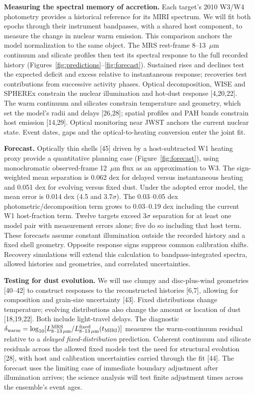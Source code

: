 \documentclass[12pt]{article}
\begin{document}
\clearpage
\noindent\textbf{Measuring the spectral memory of accretion.}
Each target's 2010 W3/W4 photometry provides a historical reference for its MIRI spectrum. We will fit both epochs through their instrument bandpasses, with a shared host component, to measure the change in nuclear warm emission. This comparison anchors the model normalization to the same object. The MRS rest-frame 8--13~$\mu$m continuum and silicate profiles then test its spectral response to the full recorded history (Figures~\ref{fig:predictions}--\ref{fig:forecast}). Sustained rises and declines test the expected deficit and excess relative to instantaneous response; recoveries test contributions from successive activity phases. Optical decomposition, WISE and SPHEREx constrain the nuclear illumination and hot-dust response [4,20,22]. The warm continuum and silicates constrain temperature and geometry, which set the model's radii and delays [26,28]; spatial profiles and PAH bands constrain host emission [14,29]. Optical monitoring near JWST anchors the current nuclear state. Event dates, gaps and the optical-to-heating conversion enter the joint fit.

\noindent\textbf{Forecast.} Optically thin shells [45] driven by a host-subtracted W1 heating proxy provide a quantitative planning case (Figure~\ref{fig:forecast}), using monochromatic observed-frame 12~$\mu$m flux as an approximation to W3. The sign-weighted mean separation is 0.062 dex for delayed versus instantaneous heating and 0.051 dex for evolving versus fixed dust. Under the adopted error model, the mean error is 0.014 dex (4.5 and 3.7$\sigma$). The 0.03--0.05 dex photometric/decomposition term grows to 0.03--0.19 dex including the current W1 host-fraction term. Twelve targets exceed $3\sigma$ separation for at least one model pair with measurement errors alone; five do so including that host term. These forecasts assume constant illumination outside the recorded history and a fixed shell geometry. Opposite response signs suppress common calibration shifts. Recovery simulations will extend this calculation to bandpass-integrated spectra, allowed histories and geometries, and correlated uncertainties.

\noindent\textbf{Testing for dust evolution.}
We will use clumpy and disc-plus-wind geometries [40--42] to construct responses to the reconstructed histories [6,7], allowing for composition and grain-size uncertainty [43]. Fixed distributions change temperature; evolving distributions also change the amount or location of dust [18,19,22]. Both include light-travel delays. The diagnostic $\delta_{\rm warm}=\log_{10}[L^{\rm MRS}_{8\text{--}13\,\mu{\rm m}}/L^{\rm fixed}_{8\text{--}13\,\mu{\rm m}}(t_{\rm MIRI})]$ measures the warm-continuum residual relative to a \emph{delayed fixed-distribution} prediction. Coherent continuum and silicate residuals across the allowed fixed models test the need for structural evolution [28], with host and calibration uncertainties carried through the fit [44]. The forecast uses the limiting case of immediate boundary adjustment after illumination arrives; the science analysis will test finite adjustment times across the ensemble's event ages.
\end{document}
